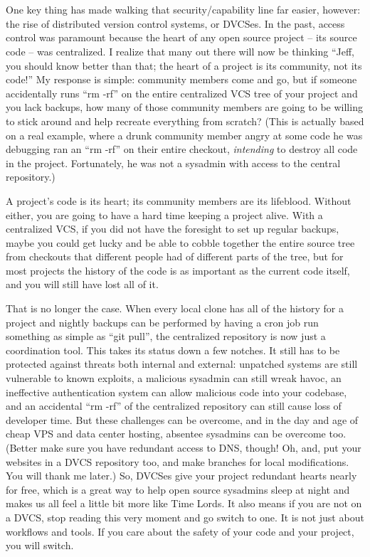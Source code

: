 \section*{}One key thing has made walking that security/capability line far easier,
however: the rise of distributed version control systems, or DVCSes.
In the past, access control was paramount because the heart of any open source
project -- its source code -- was centralized. I realize that many out there
will now be thinking ``Jeff, you should know better than that; the heart of a
project is its community, not its code!'' My response is simple: community
members come and go, but if someone accidentally runs ``rm -rf'' on the entire
centralized VCS tree of your project and you lack backups, how many of those community members are
going to be willing to stick around and help recreate everything from scratch? 
(This is actually based on a real example, where a drunk community member angry at some code he was debugging
ran an ``rm -rf'' on their entire checkout, \emph{intending} to destroy all code
in the project. Fortunately, he was not a sysadmin with access to the central repository.)

A project’s code is its heart; its community members are its lifeblood. Without
either, you are going to have a hard time keeping a project alive. With a centralized VCS,
if you did not have the foresight to set up regular backups, maybe you could get lucky and be
able to cobble together the entire source tree from checkouts
that different people had of different parts of the tree, but for most projects the history
of the code is as important as the current code itself, and you will still have
lost all of it.

That is no longer the case. When every local clone has all of the history for a
project and nightly backups can be performed by having a cron job run something as simple
as ``git pull'', the centralized repository is now just a coordination tool. This takes
its status down a few notches. It still has to be protected against threats both
internal and external: unpatched systems are still vulnerable to known exploits,
a malicious sysadmin can still wreak havoc, an ineffective authentication system
can allow malicious code into your codebase, and an accidental ``rm -rf'' of the
centralized repository can still cause loss of developer time. But these
challenges can be overcome, and in the day and age of cheap VPS and data center
hosting, absentee sysadmins can be overcome too. (Better make sure you have
redundant access to DNS, though! Oh, and, put your websites in a DVCS repository
too, and make branches for local modifications. You will thank me later.)
So, DVCSes give your project redundant hearts nearly for free, which is a great
way to help open source sysadmins sleep at night and makes us all feel a little
bit more like Time Lords. It also means if you are not on a DVCS, stop reading
this very moment and go switch to one. It is not just about workflows and tools. If
you care about the safety of your code and your project, you will switch.

